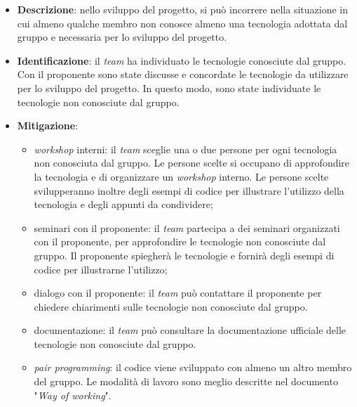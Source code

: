 \label{risk:conoscenza tecnologie carente}
\begin{itemize}
	\item \textbf{Descrizione}:
	      nello sviluppo del progetto, si può incorrere nella situazione in cui
	      almeno qualche membro non conosce almeno una tecnologia adottata dal
	      gruppo e necessaria per lo sviluppo del progetto.

	\item \textbf{Identificazione}: il \textit{team} ha individuato le
	      tecnologie conosciute dal gruppo. Con il proponente sono state
	      discusse e concordate le tecnologie da utilizzare per lo sviluppo del
	      progetto. In questo modo, sono state individuate le tecnologie
	      non conosciute dal gruppo.

	\item \textbf{Mitigazione}:
	      \begin{itemize}
		      \item \textit{workshop} interni: il \textit{team} sceglie
		            una o due persone per ogni tecnologia non conosciuta dal
		            gruppo. Le persone scelte si occupano di approfondire la
		            tecnologia e di organizzare un \textit{workshop} interno.
		            Le persone scelte svilupperanno inoltre degli esempi di
		            codice per illustrare l'utilizzo della tecnologia e degli
		            appunti da condividere;

		      \item seminari con il proponente: il \textit{team} partecipa a
		            dei seminari organizzati con il proponente, per approfondire
		            le tecnologie non conosciute dal gruppo. Il proponente
		            spiegherà le tecnologie e fornirà degli esempi di codice
		            per illustrarne l'utilizzo;

		      \item dialogo con il proponente: il \textit{team} può
		            contattare il proponente per chiedere chiarimenti sulle
		            tecnologie non conosciute dal gruppo.

		      \item documentazione: il \textit{team} può consultare la
		            documentazione ufficiale delle tecnologie non conosciute
		            dal gruppo.

		      \item \textit{pair programming}: il codice viene sviluppato con
		            almeno un altro membro del gruppo. Le modalità di lavoro
		            sono meglio descritte nel documento "\textit{Way of
			            working}".


\end{itemize}
\end{itemize}
